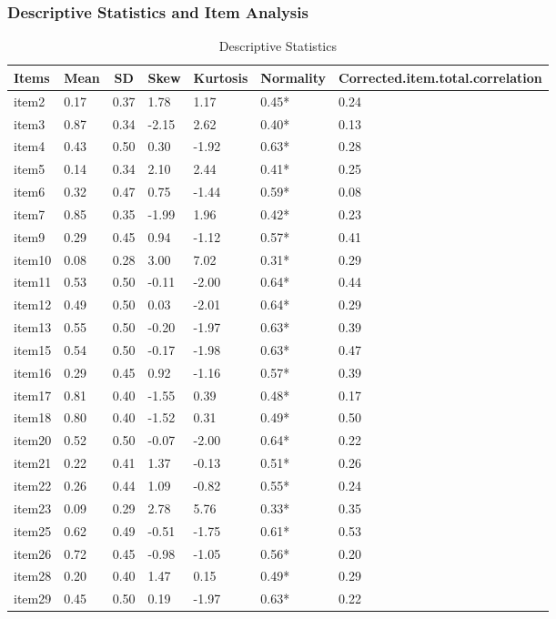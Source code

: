 \documentclass[
  man]{apa6}
\begin{document}
\hypertarget{descriptive-statistics-and-item-analysis}{%
\subsubsection{Descriptive Statistics and Item Analysis}\label{descriptive-statistics-and-item-analysis}}

\begin{table}[tbp]

\begin{center}
\begin{threeparttable}

\caption{\label{tab:tabDes}Descriptive Statistics}

\begin{tabular}{lllllll}
\toprule
Items & \multicolumn{1}{c}{Mean} & \multicolumn{1}{c}{SD} & \multicolumn{1}{c}{Skew} & \multicolumn{1}{c}{Kurtosis} & \multicolumn{1}{c}{Normality} & \multicolumn{1}{c}{Corrected.item.total.correlation}\\
\midrule
item2 & 0.17 & 0.37 & 1.78 & 1.17 & 0.45* & 0.24\\
item3 & 0.87 & 0.34 & -2.15 & 2.62 & 0.40* & 0.13\\
item4 & 0.43 & 0.50 & 0.30 & -1.92 & 0.63* & 0.28\\
item5 & 0.14 & 0.34 & 2.10 & 2.44 & 0.41* & 0.25\\
item6 & 0.32 & 0.47 & 0.75 & -1.44 & 0.59* & 0.08\\
item7 & 0.85 & 0.35 & -1.99 & 1.96 & 0.42* & 0.23\\
item9 & 0.29 & 0.45 & 0.94 & -1.12 & 0.57* & 0.41\\
item10 & 0.08 & 0.28 & 3.00 & 7.02 & 0.31* & 0.29\\
item11 & 0.53 & 0.50 & -0.11 & -2.00 & 0.64* & 0.44\\
item12 & 0.49 & 0.50 & 0.03 & -2.01 & 0.64* & 0.29\\
item13 & 0.55 & 0.50 & -0.20 & -1.97 & 0.63* & 0.39\\
item15 & 0.54 & 0.50 & -0.17 & -1.98 & 0.63* & 0.47\\
item16 & 0.29 & 0.45 & 0.92 & -1.16 & 0.57* & 0.39\\
item17 & 0.81 & 0.40 & -1.55 & 0.39 & 0.48* & 0.17\\
item18 & 0.80 & 0.40 & -1.52 & 0.31 & 0.49* & 0.50\\
item20 & 0.52 & 0.50 & -0.07 & -2.00 & 0.64* & 0.22\\
item21 & 0.22 & 0.41 & 1.37 & -0.13 & 0.51* & 0.26\\
item22 & 0.26 & 0.44 & 1.09 & -0.82 & 0.55* & 0.24\\
item23 & 0.09 & 0.29 & 2.78 & 5.76 & 0.33* & 0.35\\
item25 & 0.62 & 0.49 & -0.51 & -1.75 & 0.61* & 0.53\\
item26 & 0.72 & 0.45 & -0.98 & -1.05 & 0.56* & 0.20\\
item28 & 0.20 & 0.40 & 1.47 & 0.15 & 0.49* & 0.29\\
item29 & 0.45 & 0.50 & 0.19 & -1.97 & 0.63* & 0.22\\
\bottomrule
\end{tabular}


\end{threeparttable}
\end{center}
\end{table}
\end{document}
